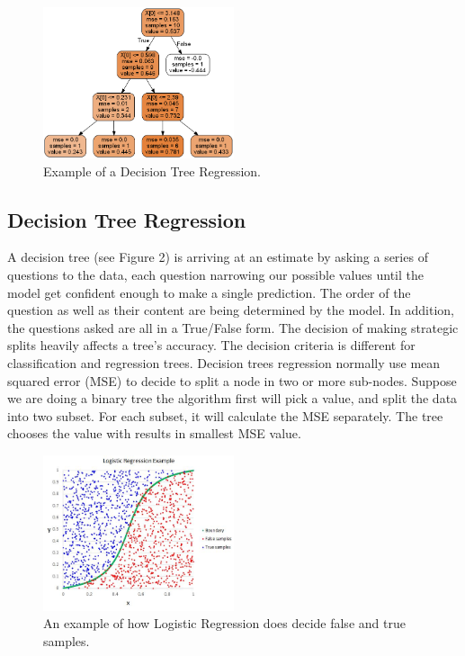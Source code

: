 \begin{figure}[h!]
  \includegraphics[width=0.5\textwidth]{decision_tree_regression}
\caption{Example of a Decision Tree Regression.}
\end{figure}

\subsection{Decision Tree Regression}

A decision tree (see Figure 2) is arriving at an estimate by asking a series of questions to the data, each question narrowing our possible values until the model get confident enough to make a single prediction. 
The order of the question as well as their content are being determined by the model. In addition, the questions asked  are all in a True/False form.
The decision of making strategic splits heavily affects a tree’s accuracy. The decision criteria is different for classification and regression trees.
Decision trees regression normally use mean squared error (MSE) to decide to split a node in two or more sub-nodes. Suppose we are doing a binary tree the algorithm first will pick a value, and split the data into two subset. For each subset, it will calculate the MSE separately. 
The tree chooses the value with results in smallest MSE value.

\begin{figure}[h!]
  \includegraphics[width=0.5\textwidth]{logistic_regression_example}
\caption{An example of how Logistic Regression does decide false and true samples.}
\end{figure}

